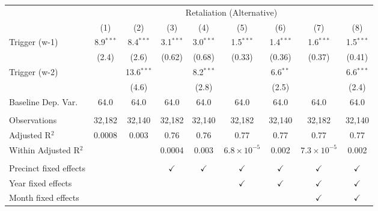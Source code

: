 \begingroup \centering \begin{tabular}{lcccccccc}    \toprule     & \multicolumn{8}{c}{Retaliation (Alternative)}\\                           & (1)         & (2)          & (3)           & (4)           & (5)                  & (6)           & (7)                  & (8)\\      \midrule     Trigger (w-1)          & 8.9$^{***}$ & 8.4$^{***}$  & 3.1$^{***}$   & 3.0$^{***}$   & 1.5$^{***}$          & 1.4$^{***}$   & 1.6$^{***}$          & 1.5$^{***}$\\                              & (2.4)       & (2.6)        & (0.62)        & (0.68)        & (0.33)               & (0.36)        & (0.37)               & (0.41)\\       Trigger (w-2)          &             & 13.6$^{***}$ &               & 8.2$^{***}$   &                      & 6.6$^{**}$    &                      & 6.6$^{***}$\\                              &             & (4.6)        &               & (2.8)         &                      & (2.5)         &                      & (2.4)\\       Baseline Dep. Var.     & 64.0        & 64.0         & 64.0          & 64.0          & 64.0                 & 64.0          & 64.0                 & 64.0\\       \\    Observations           & 32,182      & 32,140       & 32,182        & 32,140        & 32,182               & 32,140        & 32,182               & 32,140\\      Adjusted R$^2$         & 0.0008      & 0.003        & 0.76          & 0.76          & 0.77                 & 0.77          & 0.77                 & 0.77\\      Within Adjusted R$^2$  &             &              & 0.0004        & 0.003         & $6.8\times 10^{-5}$  & 0.002         & $7.3\times 10^{-5}$  & 0.002\\       \\    Precinct fixed effects &             &              & $\checkmark$  & $\checkmark$  & $\checkmark$         & $\checkmark$  & $\checkmark$         & $\checkmark$\\       Year fixed effects     &             &              &               &               & $\checkmark$         & $\checkmark$  & $\checkmark$         & $\checkmark$\\       Month fixed effects    &             &              &               &               &                      &               & $\checkmark$         & $\checkmark$\\       \bottomrule \end{tabular} \par\endgroup